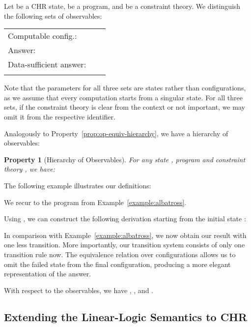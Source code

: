 \documentclass[acmtocl]{acmtrans2m}
\newtheorem{property}[theorem]{Property}
\newcommand{\chrv}{CHR}
\begin{document}
\begin{definition}[Observables]
	\label{def:observables-vee}
Let  be a CHR state,  be a program, and  be a constraint theory. We
distinguish the following sets of observables:

\medskip
\begin{tabular}{l @{\,} r @{\,} l}
Computable config.: &
	 &
		\\
Answer: &
	 &
		\\
Data-sufficient answer: &
	 &
		 \\
\multicolumn{2}{c}{} & \quad
		
\end{tabular}

\medskip
Note that the parameters for all three sets are states rather than
configurations, as we assume that every computation starts from a singular
state. For all three sets, if the constraint theory  is clear from the
context or not important, we may omit it from the respective identifier.
\end{definition}

Analogously to Property~\ref{prop:op-equiv-hierarchy}, we have a hierarchy of
observables:

\begin{property}[Hierarchy of Observables]
For any state , program  and constraint theory , we have:

\end{property}

The following example illustrates our definitions:

\begin{example}
\label{example:albatross_vee}
We recur to the program from Example~\ref{example:albatross}.

Using , we can construct the following derivation starting from the
initial state :


In comparison with Example~\ref{example:albatross}, we now obtain our result with
one less transition. More importantly, our transition system consists of only one
transition rule now. The equivalence relation over configurations allows us to
omit the failed state from the final configuration, producing a more elegant
representation of the answer.

With respect to the observables, we have , , and .
\end{example}

\subsection{Extending the Linear-Logic Semantics to \chrv}
\label{sec:vee-extend}
\end{document}
